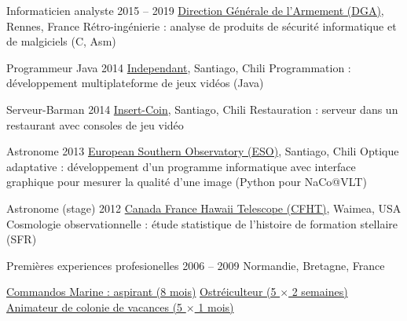 \begin{joblist}[12.8][8.4][4]

\setlength{\parskip}{0.3cm}
\vspace{-0.4cm}

\item[Informaticien analyste]{2015 -- 2019}
	{
  \href{http://www.defense.gouv.fr/dga/}{Direction Générale de l'Armement (DGA)}, Rennes, France
  }
  {Rétro-ingénierie : analyse de produits de sécurité informatique et de malgiciels (C, Asm)}

\item[Programmeur Java]{2014}
	{
	\href{https://tinmarino.github.io/Page/}{Independant}, Santiago, Chili
  }
  {Programmation : développement multiplateforme de jeux vidéos (Java)}


\item[Serveur-Barman]{2014}
	{
	\href{http://www.insertcoin.cl/}{Insert-Coin}, Santiago, Chili
  }
	{Restauration : serveur dans un restaurant avec consoles de jeu vidéo}


\item[Astronome]{2013}
	{
	\href{http://www.eso.org/public/}{European Southern Observatory (ESO)}, Santiago, Chili
	}
  {Optique adaptative : développement d'un programme informatique avec interface graphique pour mesurer la qualité d'une image (Python pour NaCo@VLT)}


\item[Astronome (stage)]{2012}
	{
\href{http://www.eso.org/public/}{Canada France Hawaii Telescope (CFHT)}, Waimea, USA
  }
  {Cosmologie observationnelle : étude statistique de l'histoire de formation stellaire (SFR)}

\item[Premières experiences profesionelles]{2006 -- 2009}
	{
	Normandie, Bretagne, France
	}
	{
    \renewcommand\labelitemi{{\boldmath$\cdot$}}
		\vspace{-0.8cm}
    \setlength{\parskip}{0cm}
		\begin{itemize}
		\setlength\itemsep{0cm}
    \cvitem \href{http://www.defense.gouv.fr/marine/organisation/forces/fusiliers-marins-et-commandos/force-maritime-des-fusiliers-marins-et-commandos}{Commandos Marine : aspirant (8 mois)}
    \cvitem \href{http://huitresdesaintvaast.fr/}{Ostréiculteur (5 $\times$ 2 semaines)}
    \cvitem \href{http://www.vacances-pour-tous.org/}{Animateur de colonie de vacances (5 $\times$ 1 mois)}
		\end{itemize}
  }
\end{joblist}



